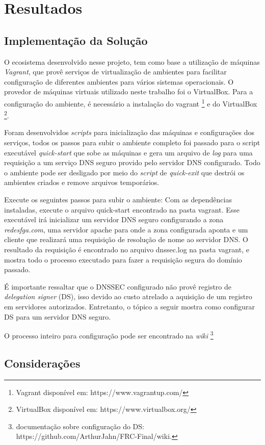 \documentclass[a4paper]{report} %
\begin{document}
\chapter{Resultados}

\section{Implementação da Solução}
O ecosistema desenvolvido nesse projeto, tem como base a utilização de máquinas \textit{Vagrant}, que provê serviços de virtualização de ambientes para facilitar configuração de diferentes ambientes para vários sistemas operacionais. O provedor de máquinas virtuais utilizado neste trabalho foi o VirtualBox. Para a configuração do ambiente, é necessário a instalação do vagrant \footnote{Vagrant disponível em: https://www.vagrantup.com/} e do VirtualBox \footnote{VirtualBox disponível em: https://www.virtualbox.org/}.

Foram desenvolvidos \textit{scripts} para inicialização das máquinas e configurações dos serviços, todos os passos para subir o ambiente completo foi passado para o script executável \textit{quick-start} que sobe as máquinas e gera um arquivo de \textit{log} para uma requisição a um serviço DNS seguro provido pelo servidor DNS configurado. Todo o ambiente pode ser desligado por meio do \textit{script} de \textit{quick-exit} que destrói os ambientes criados e remove arquivos temporários.

Execute os seguintes passos para subir o ambiente: Com as dependências instaladas, execute o arquivo quick-start encontrado na pasta vagrant. Esse executável irá inicializar um servidor DNS seguro configurando a zona \textit{redesfga.com}, uma servidor apache para onde a zona configurada aponta e um cliente que realizará uma requisição de resolução de nome ao servidor DNS. O resultado da requisição é encontrado no arquivo dnssec.log na pasta vagrant, e mostra todo o processo executado para fazer a requisição segura do domínio passado.

É importante ressaltar que o DNSSEC configurado não provê registro de \textit{delegation signer} (DS), isso devido ao custo atrelado a aquisição de um registro em servidores autorizados. Entretanto, o tópico a seguir mostra como configurar DS para um servidor DNS seguro.

O processo inteiro para configuração pode ser encontrado na \textit{wiki} \footnote{documentação sobre configuração do DS: https://github.com/ArthurJahn/FRC-Final/wiki.}  
\section{Considerações}
\end{document}

